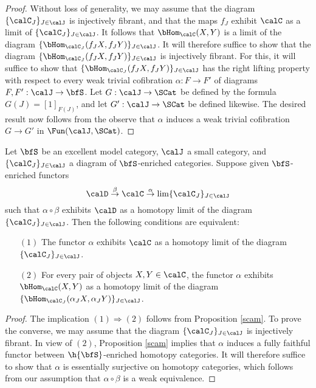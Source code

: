 \begin{Simplicial Categories}
\begin{proof}
Without loss of generality, we may assume that the diagram $\{ \calC_{J} \}_{J \in \calJ}$ is injectively fibrant, and that the maps $f_{J}$ exhibit $\calC$ as a limit of $\{ \calC_{J} \}_{J \in \calJ}$. 
It follows that $\bHom_{\calC}(X,Y)$ is a limit of the diagram $\{ \bHom_{\calC_J}( f_J X, f_J Y) \}_{J \in \calJ}$.
It will therefore suffice to show that the diagram $\{ \bHom_{ \calC_{J}}( f_J X, f_J Y) \}_{J \in \calJ}$
is injectively fibrant. For this, it will suffice to show that $\{ \bHom_{ \calC_{J}}( f_J X, f_J Y) \}_{J \in \calJ}$
has the right lifting property with respect to every weak trivial cofibration 
$\alpha: F \rightarrow F'$ of diagrams $F,F': \calJ \rightarrow \bfS$. Let
$G: \calJ \rightarrow \SCat$ be defined by the formula
$G(J) = [1]_{F(J)}$, and let $G': \calJ \rightarrow \SCat$ be defined likewise. The desired
result now follows from the observe that $\alpha$ induces a weak trivial cofibration
$G \rightarrow G'$ in $\Fun( \calJ, \SCat)$. 
\end{proof}

\begin{corollary}\label{wspin}
Let $\bfS$ be an excellent model category, $\calJ$ a small category, and
$\{ \calC_{J} \}_{J \in \calJ}$ a diagram of $\bfS$-enriched categories.
Suppose given $\bfS$-enriched functors
$$ \calD \stackrel{\beta}{\rightarrow} \calC \stackrel{\alpha}{\rightarrow} \lim \{ \calC_{J} \}_{J \in \calJ} $$
such that $\alpha \circ \beta$ exhibits $\calD$ as a homotopy limit of the diagram
$\{ \calC_{J} \}_{J \in \calJ}$. Then the following conditions are equivalent:
\begin{itemize}
\item[$(1)$] The functor $\alpha$ exhibits $\calC$ as a homotopy limit of the diagram
$\{ \calC_{J} \}_{J \in \calJ}$.
\item[$(2)$] For every pair of objects $X,Y \in \calC$, the functor $\alpha$ exhibits
$\bHom_{\calC}(X,Y)$ as a homotopy limit of the diagram $\{ \bHom_{\calC_{J}}( \alpha_{J} X,
\alpha_{J} Y ) \}_{J \in \calJ}$.
\end{itemize}
\end{corollary}

\begin{proof}
The implication $(1) \Rightarrow (2)$ follows from Proposition \ref{scam}. To prove the
converse, we may assume that the diagram $\{ \calC_{J} \}_{J \in \calJ}$ is injectively fibrant.
In view of $(2)$, Proposition \ref{scam} implies that $\alpha$ induces a fully faithful functor
between $\h{\bfS}$-enriched homotopy categories. It will therefore suffice to show that
$\alpha$ is essentially surjective on homotopy categories, which follows from our assumption that 
$\alpha \circ \beta$ is a weak equivalence. 
\end{proof}


\end{Simplicial Categories}
